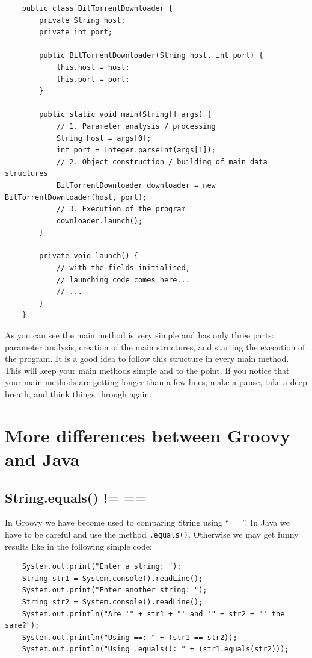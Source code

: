 \begin{verbatim}
    public class BitTorrentDownloader {
        private String host;
        private int port;
    
        public BitTorrentDownloader(String host, int port) {
            this.host = host;
            this.port = port;
        }
    
        public static void main(String[] args) {
            // 1. Parameter analysis / processing
            String host = args[0];
            int port = Integer.parseInt(args[1]);
            // 2. Object construction / building of main data structures
            BitTorrentDownloader downloader = new BitTorrentDownloader(host, port);
            // 3. Execution of the program
            downloader.launch();
        }

        private void launch() {
            // with the fields initialised, 
            // launching code comes here...
            // ...
        }
    }
\end{verbatim}

As you can see the main method is very simple and has only three
parts: parameter analysis, creation of the main structures, and
starting the execution of the program. It is a good idea to follow
this structure in every main method. This will keep your main methods
simple and to the point. If you notice that your main methods are
getting longer than a few lines, make a pause, take a deep breath, and
think things through again. 

\section{More differences between Groovy and Java}
\label{sec:more-diff-betw}

\subsection{String.equals() != ==}
\label{sec:string.equals-=-==}

In Groovy we have become used to comparing String using ``==''. In
Java we have to be careful and use the method
\verb+.equals()+. Otherwise we may get funny results like in the
following simple code: 

\begin{verbatim}
    System.out.print("Enter a string: ");
    String str1 = System.console().readLine();
    System.out.print("Enter another string: ");
    String str2 = System.console().readLine();
    System.out.println("Are '" + str1 + "' and '" + str2 + "' the same?");
    System.out.println("Using ==: " + (str1 == str2));
    System.out.println("Using .equals(): " + (str1.equals(str2)));
\end{verbatim}

